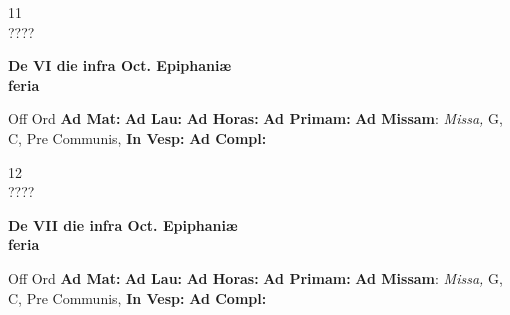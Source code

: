 \documentclass[10pt, openany]{book}
\begin{document}
    \begin{center}
        \begin{minipage}{3.5in}
            \vspace{2em}
            \begin{minipage}{0.5in}
                {\Huge 11} \\
                {\normalsize ????}
            \end{minipage}
            \begin{minipage}{3.0in}
                \textbf{ \large De VI die infra Oct. Epiphaniæ \\
                \textnormal{\normalsize feria}}

            \end{minipage}
            \begin{justify}Off Ord
                \textbf{Ad Mat: }
                \textbf{Ad Lau: }
                \textbf{Ad Horas: }
                \textbf{Ad Primam: }\textbf{Ad Missam}: \textit{Missa,} G, C, Pre Communis, 
                \textbf{In Vesp: }
                \textbf{Ad Compl: }
            \end{justify}
        \end{minipage}
    \end{center}

    \begin{center}
        \begin{minipage}{3.5in}
            \vspace{2em}
            \begin{minipage}{0.5in}
                {\Huge 12} \\
                {\normalsize ????}
            \end{minipage}
            \begin{minipage}{3.0in}
                \textbf{ \large De VII die infra Oct. Epiphaniæ \\
                \textnormal{\normalsize feria}}

            \end{minipage}
            \begin{justify}Off Ord
                \textbf{Ad Mat: }
                \textbf{Ad Lau: }
                \textbf{Ad Horas: }
                \textbf{Ad Primam: }\textbf{Ad Missam}: \textit{Missa,} G, C, Pre Communis, 
                \textbf{In Vesp: }
                \textbf{Ad Compl: }
            \end{justify}
        \end{minipage}
    \end{center}
\end{document}
